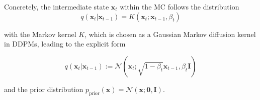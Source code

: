 Concretely, the intermediate state $\mathbf{x}_t$ within the \gls{MC} follows the distribution
\begin{equation}
    q(\mathbf{x}_t | \mathbf{x}_{t-1}) = K(\mathbf{x}_t; \mathbf{x}_{t-1}, \beta_t)
\end{equation}

with the Markov kernel $K$, which is chosen as a Gaussian Markov diffusion kernel  in \gls{DDPM}s, leading to the explicit form 

\begin{equation}
    q \left(\mathbf{x}_t | \mathbf{x}_{t-1} \right) := \mathcal{N} \left( \mathbf{x}_t; \sqrt{1-\beta_t}\mathbf{x}_{t-1}, \beta_t \mathbf{I} \right)
\end{equation}



and the prior distribution $p_\text{prior}(\mathbf{x}) = \mathcal{N}(\mathbf{x}; \mathbf{0}, \mathbf{I})$.


